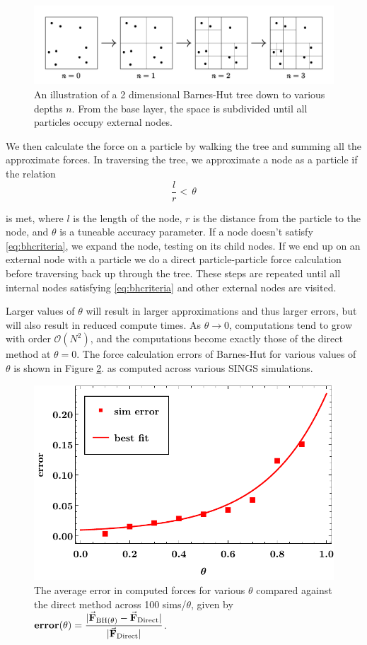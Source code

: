 \documentclass[12pt, twoside, letterpaper]{article}
\begin{document}
\begin{figure}[h] 
\caption{An illustration of a 2 dimensional Barnes-Hut tree down to various depths $n$. From the base layer, the space is subdivided until all particles occupy external nodes.}
\centerline{\includegraphics[width=\textwidth]{bhconstruction.pdf}}
\label{fig:bhtree}
\end{figure} 

We then calculate the force on a particle by walking the tree and summing all the approximate forces. In traversing the tree, we  approximate a node as a particle if the relation
\begin{equation} \label{eq:bhcriteria}
\frac{l}{r} < \, \theta
\end{equation}

\noindent is met, where $l$ is the length of the node, $r$ is the distance from the particle to the node, and $\theta$ is a tuneable accuracy parameter. If a node doesn't satisfy \eqref{eq:bhcriteria}, we expand the node, testing on its child nodes. If we end up on an external node with a particle we do a direct particle-particle force calculation before traversing back up through the tree. These steps are repeated until all internal nodes satisfying \eqref{eq:bhcriteria} and other external nodes are visited.

Larger values of $\theta$ will result in larger approximations and thus larger errors, but will also result in reduced compute times. As $\theta \rightarrow 0$, computations tend to grow with order $\mathcal{O}(N^2)$, and the computations become exactly those of the direct method at $\theta = 0$.  The force calculation errors of Barnes-Hut for various values of $\theta$ is shown in Figure \ref{fig:errortheta}.
as computed across various SINGS simulations.
\begin{figure}[h]
\caption{The average error in computed forces for various $\theta$ compared against the direct method across 100 sims/$\theta$, given by $\textbf{error}(\theta) = \dfrac{|\va{F}_{\text{BH}(\theta)}-\va{F}_{\text{Direct}}|}{|\va{F}_{\text{Direct}}|}$.}
\centerline{\includegraphics[width=.7\textwidth]{errortheta.pdf}}
\label{fig:errortheta}
\end{figure}
\end{document}

